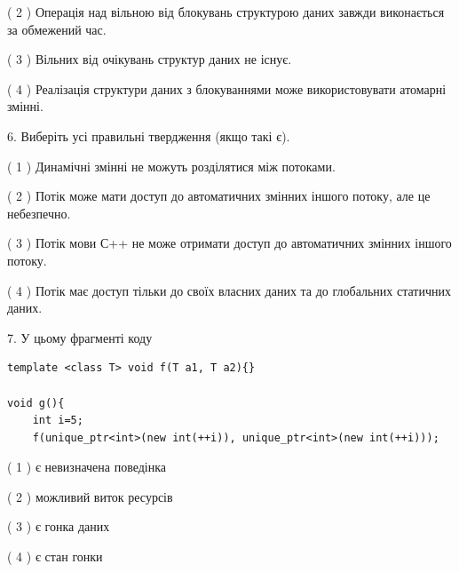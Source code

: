 \documentclass[12pt, ukrainian]{article}
\begin{document}
\begin {large}
{( 2 ) Операція над вільною від блокувань структурою даних завжди виконається за обмежений час.%

( 3 ) Вільних від очікувань структур даних не існує.%

( 4 ) Реалізація структури даних з блокуваннями може використовувати атомарні змінні.%
\newpage



\vspace{5mm}
6. Виберіть усі правильні твердження (якщо такі є).\par
\vspace{2mm}

( 1 ) Динамічні змінні не можуть розділятися між потоками.%

( 2 ) Потік може мати доступ до автоматичних змінних іншого потоку, але це небезпечно.%

( 3 ) Потік мови С++ не може отримати доступ до автоматичних змінних іншого потоку.%

( 4 ) Потік має доступ тільки до своїх власних даних та до глобальних статичних даних.%


\vspace{5mm}
7. У цьому фрагменті коду
\begin{verbatim}
template <class T> void f(T a1, T a2){}

void g(){
    int i=5;
    f(unique_ptr<int>(new int(++i)), unique_ptr<int>(new int(++i)));
\end{verbatim}

( 1 ) є невизначена поведінка%

( 2 ) можливий виток ресурсів%

( 3 ) є гонка даних%

( 4 ) є стан гонки%
}
\end {large}
\end{document}
